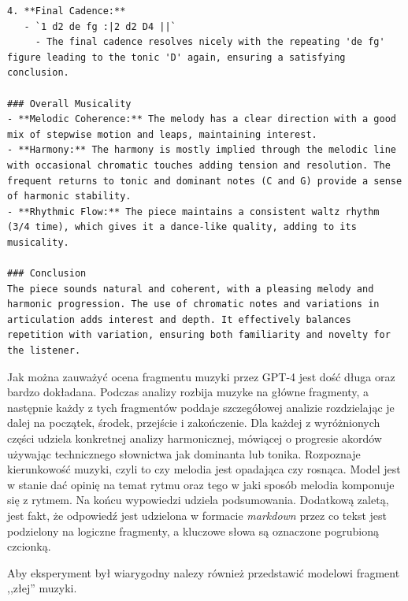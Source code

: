 \documentclass[data-science]{agh-wi} %
\begin{document}
\begin{verbatim}
4. **Final Cadence:**
   - `1 d2 de fg :|2 d2 D4 ||`
     - The final cadence resolves nicely with the repeating 'de fg' figure leading to the tonic 'D' again, ensuring a satisfying conclusion.

### Overall Musicality
- **Melodic Coherence:** The melody has a clear direction with a good mix of stepwise motion and leaps, maintaining interest.
- **Harmony:** The harmony is mostly implied through the melodic line with occasional chromatic touches adding tension and resolution. The frequent returns to tonic and dominant notes (C and G) provide a sense of harmonic stability.
- **Rhythmic Flow:** The piece maintains a consistent waltz rhythm (3/4 time), which gives it a dance-like quality, adding to its musicality.

### Conclusion
The piece sounds natural and coherent, with a pleasing melody and harmonic progression. The use of chromatic notes and variations in articulation adds interest and depth. It effectively balances repetition with variation, ensuring both familiarity and novelty for the listener.
\end{verbatim}

Jak można zauważyć ocena fragmentu muzyki przez GPT-4 jest dość długa oraz bardzo dokładana. Podczas analizy rozbija muzyke na główne fragmenty, a następnie każdy z tych fragmentów poddaje szczegółowej analizie rozdzielając je dalej na początek, środek, przejście i zakończenie. Dla każdej z wyróżnionych części udziela konkretnej analizy harmonicznej, mówiącej o progresie akordów używając technicznego słownictwa jak dominanta lub tonika. Rozpoznaje kierunkowość muzyki, czyli to czy melodia jest opadająca czy rosnąca. Model jest w stanie dać opinię na temat rytmu oraz tego w jaki sposób melodia komponuje się z rytmem. Na końcu wypowiedzi udziela podsumowania. Dodatkową zaletą, jest fakt, że odpowiedź jest udzielona w formacie \textit{markdown} przez co tekst jest podzielony na logiczne fragmenty, a kluczowe słowa są oznaczone pogrubioną czcionką.

Aby eksperyment był wiarygodny nalezy również przedstawić modelowi fragment ,,złej'' muzyki.
\end{document}
